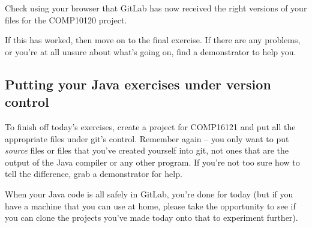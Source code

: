 Check using your browser that GitLab has now received the right versions of your files for the COMP10120 project.

If this has worked, then move on to the final exercise. If there are any problems, or you're at all unsure about what's going on, find a demonstrator to help you. 

\subsection{Putting your Java exercises under version control}

To finish off today's exercises, create a project for COMP16121 and put all the appropriate files under git's control. Remember again -- you only want to put \emph{source} files or files that you've created yourself into git, not ones that are the output of the Java compiler or any other program. If you're not too sure how to tell the difference, grab a demonstrator for help. 

When your Java code is all safely in GitLab, you're done for today (but if you have a machine that you can use at home, please take the opportunity to see if you can clone the projects you've made today onto that to experiment further). 





















